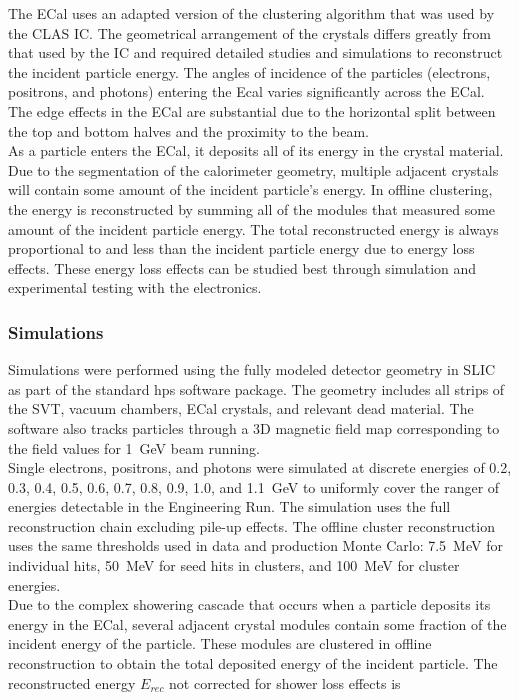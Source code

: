 The ECal uses an adapted version of the clustering algorithm that was used by the CLAS IC. The geometrical arrangement of the crystals differs greatly from that used by the IC and required detailed studies and simulations to reconstruct the incident particle energy. The angles of incidence of the particles (electrons, positrons, and photons) entering the Ecal varies significantly across the ECal. The edge effects in the ECal are substantial due to the horizontal split between the top and bottom halves and  the proximity to the beam. \\
\indent As a particle enters the ECal, it deposits all of its energy in the crystal material. Due to the segmentation of the calorimeter geometry, multiple adjacent crystals will contain some amount of the incident particle's energy. In offline clustering, the energy is reconstructed by summing all of the modules that measured some amount of the incident particle energy. The total reconstructed energy is always proportional to and less than the incident particle energy due to energy loss effects. These energy loss effects can be studied best through simulation and experimental testing with the electronics. 

\subsubsection{Simulations}
Simulations were performed using the fully modeled detector geometry in SLIC as part of the standard hps software package. The geometry includes all strips of the SVT, vacuum chambers, ECal crystals, and relevant dead material. The software also tracks particles through a 3D magnetic field map corresponding to the field values for 1~GeV beam running.~\cite{szumila-vance_hps_2016} \\
\indent Single electrons, positrons, and photons were simulated at discrete energies of 0.2, 0.3, 0.4, 0.5, 0.6, 0.7, 0.8,  0.9, 1.0, and 1.1~GeV to uniformly cover the ranger of energies detectable in the Engineering Run. The simulation uses the full reconstruction chain excluding pile-up effects. The offline cluster reconstruction uses the same thresholds used in data and production Monte Carlo: 7.5~MeV for individual hits, 50~MeV for seed hits in clusters, and 100~MeV for cluster energies.\\
\indent Due to the complex showering cascade that occurs when a particle deposits its energy in the ECal, several adjacent crystal modules contain some fraction of the incident energy of the particle. These modules are clustered in offline reconstruction to obtain the total deposited energy of the incident particle. The reconstructed energy $E_{rec}$ not corrected for shower loss effects is 

